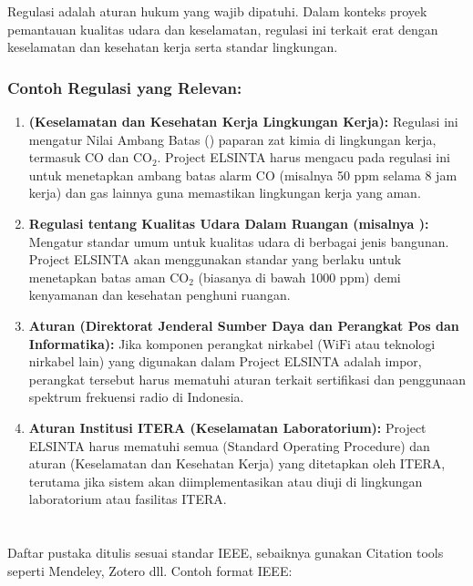 \documentclass{elsinta}
\begin{document}
Regulasi adalah aturan hukum yang wajib dipatuhi. Dalam konteks proyek pemantauan kualitas udara dan keselamatan, regulasi ini terkait erat dengan keselamatan dan kesehatan kerja serta standar lingkungan.

\subsubsection*{Contoh Regulasi yang Relevan:}
\begin{enumerate}
    \item \textbf{ (Keselamatan dan Kesehatan Kerja Lingkungan Kerja):} Regulasi ini mengatur Nilai Ambang Batas () paparan zat kimia di lingkungan kerja, termasuk $\text{CO}$ dan $\text{CO}_2$. Project ELSINTA harus mengacu pada regulasi ini untuk menetapkan ambang batas alarm $\text{CO}$ (misalnya 50 ppm selama 8 jam kerja) dan gas lainnya guna memastikan lingkungan kerja yang aman.
    \item \textbf{Regulasi  tentang Kualitas Udara Dalam Ruangan (misalnya ):} Mengatur standar umum untuk kualitas udara di berbagai jenis bangunan. Project ELSINTA akan menggunakan standar  yang berlaku untuk menetapkan batas aman $\text{CO}_2$ (biasanya di bawah 1000 ppm) demi kenyamanan dan kesehatan penghuni ruangan.
    \item \textbf{Aturan  (Direktorat Jenderal Sumber Daya dan Perangkat Pos dan Informatika):} Jika komponen perangkat nirkabel ($\text{WiFi}$ atau teknologi nirkabel lain) yang digunakan dalam Project ELSINTA adalah impor, perangkat tersebut harus mematuhi aturan  terkait sertifikasi dan penggunaan spektrum frekuensi radio di Indonesia.
    \item \textbf{Aturan Institusi ITERA (Keselamatan Laboratorium):} Project ELSINTA harus mematuhi semua  (Standard Operating Procedure) dan aturan  (Keselamatan dan Kesehatan Kerja) yang ditetapkan oleh ITERA, terutama jika sistem akan diimplementasikan atau diuji di lingkungan laboratorium atau fasilitas ITERA.
\end{enumerate}

\section{\ReferencesTitle}
Daftar pustaka ditulis sesuai standar IEEE, sebaiknya gunakan Citation tools seperti Mendeley, Zotero dll.  
Contoh format IEEE:  
\renewcommand{\refname}{}      %
\end{document}
